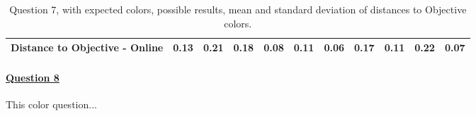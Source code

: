 \begin{table}[H]
{\begin{tabular}{lccccccccccccc}
    \multicolumn{4}{l}{Distance to Objective - Online}                                                                                               & \multicolumn{1}{|c}{0.13}        & \multicolumn{1}{c|}{0.21}    & \multicolumn{1}{|c}{0.18}        & \multicolumn{1}{c|}{0.08}    & \multicolumn{1}{|c}{\textbf{0.11}}       & \multicolumn{1}{c|}{0.06}    & \multicolumn{1}{|c}{0.17}        & \multicolumn{1}{c|}{0.11}    & \multicolumn{1}{|c}{0.22}       & \multicolumn{1}{c|}{0.07}    \\ \hline
    \end{tabular}}
  \caption[Question 7, with expected Results.]{Question 7, with expected colors, possible results, mean and standard deviation of distances to Objective colors.}
  \label{table:lab_q7_expected}
\end{table}
%
\paragraph{\ul{Question 8}}
%
This color question...
%
